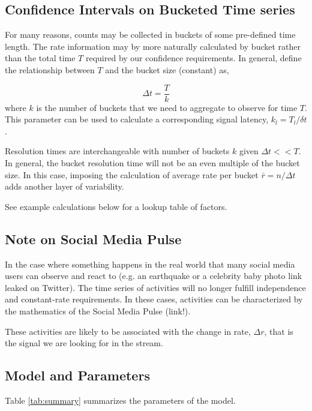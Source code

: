 \documentclass{article}
\begin{document}
\subsection{Confidence Intervals on Bucketed Time series}

For many reasons, counts may be collected in buckets of some pre-defined time length.  The rate information may by more naturally calculated by bucket rather than the total time $T$ required by our confidence requirements. In general, define the relationship between $T$ and the bucket size (constant) as,

\begin{equation}
    \label{eq:bucket}
    \Delta t = \frac{T}{k}
\end{equation}
where $k$ is the number of buckets that we need to aggregate to observe for time $T$. This parameter can be used to calculate a corresponding signal latency, $k_l = T_l/\delta t$.

Resolution times are interchangeable with number of buckets $k$ given $\Delta t << T$.  In general, the
bucket resolution time will not be an even multiple of the bucket size.  In this case, imposing the calculation of average rate per bucket $\bar{r} = n/\Delta t$ adds another layer of variability.

See example calculations below for a lookup table of factors.

\subsection{Note on Social Media Pulse}

In the case where something happens in the real world that many social media users can observe and react to (e.g. an earthquake or a celebrity baby photo link leaked on Twitter). The time series of activities will no longer fulfill independence and constant-rate requirements. In these cases, activities can be characterized by the mathematics of the Social Media Pulse (link!).

These activities are likely to be associated with the change in rate, $\Delta r$, that is the signal we are looking for in the stream.

\subsection{Model and Parameters}

Table \ref{tab:summary} summarizes the parameters of the model.
\end{document}
